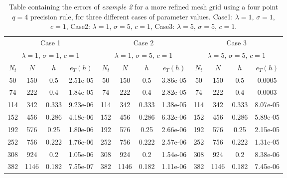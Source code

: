 \documentclass{uonmathreport}
\begin{document}
\begin{table}[H]
	\centering
	\begin{tabular}{|c|c|c|c||c|c|c|c||c|c|c|c||}
		\hline
		\multicolumn{4}{|c||}{Case 1}&
		\multicolumn{4}{|c||}{Case 2}&
		\multicolumn{4}{|c||}{Case 3}\\
		\multicolumn{4}{|c||}{$\lambda=1$, $\sigma=1$, $c=1$}&
		\multicolumn{4}{|c||}{$\lambda=1$, $\sigma=5$, $c=1$}&
		\multicolumn{4}{|c||}{$\lambda=5$, $\sigma=5$, $c=1$}\\
		$N_t$&$N$&$h$&$e_T(h)$&
		$N_t$&$N$&$h$&$e_T(h)$&
		$N_t$&$N$&$h$&$e_T(h)$\\
		\hline \hline
		50&150&0.5&2.51e-05&
		50&150&0.5&3.86e-05&
		50&150&0.5&0.0005\\
		74&222&0.4&1.84e-05&
		74&222&0.4&2.82e-05&
		74&222&0.4&0.0003\\
		114&342&0.333&9.23e-06&
		114&342&0.333&1.38e-05&
		114&342&0.333&8.07e-05\\
		152&456&0.286&4.18e-06&
		152&456&0.286&6.32e-06&
		152&456&0.286&5.89e-05\\
		192&576&0.25&1.80e-06&
		192&576&0.25&2.66e-06&
		192&576&0.25&2.15e-05\\
		252&756&0.222&1.76e-06&
		252&756&0.222&2.57e-06&
		252&756&0.222&1.31e-05\\
		308&924&0.2&1.05e-06&
		308&924&0.2&1.54e-06&
		308&924&0.2&8.38e-06\\
		382&1146&0.182&7.55e-07&
		382&1146&0.182&1.11e-06&
		382&1146&0.182&7.45e-06\\
		\hline
	\end{tabular}
	\caption{Table containing the errors of \textit{example 2} for a more refined mesh grid using a four point $q=4$ precision rule, for three different cases of parameter values. Case1: $\lambda=1$, $\sigma=1$, $c=1$, Case2: $\lambda=1$, $\sigma=5$, $c=1$, Case3: $\lambda=5$, $\sigma=5$, $c=1$.}
	\label{table:2dTri_Errors_test2_q2}
\end{table}
\end{document}
